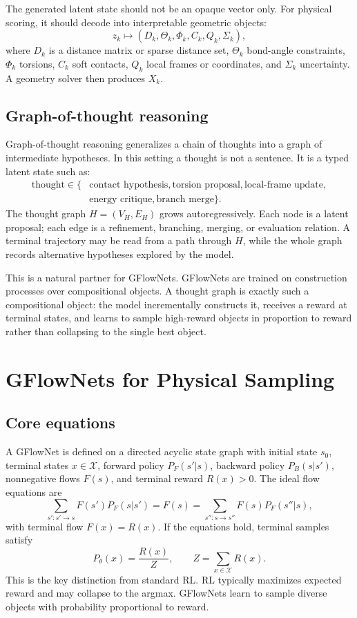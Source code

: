 \documentclass[11pt]{article}
\newcommand{\X}{\mathcal{X}}
\begin{document}
The generated latent state should not be an opaque vector only. For physical scoring, it should decode into interpretable geometric objects:
\[
z_k \mapsto
\left(
D_k,\Theta_k,\Phi_k,C_k,Q_k,\Sigma_k
\right),
\]
where $D_k$ is a distance matrix or sparse distance set, $\Theta_k$ bond-angle constraints, $\Phi_k$ torsions, $C_k$ soft contacts, $Q_k$ local frames or coordinates, and $\Sigma_k$ uncertainty. A geometry solver then produces $X_k$.

\subsection{Graph-of-thought reasoning}

Graph-of-thought reasoning generalizes a chain of thoughts into a graph of intermediate hypotheses. In this setting a thought is not a sentence. It is a typed latent state such as:
\[
\begin{aligned}
\text{thought}\in
\{&\text{contact hypothesis},\text{torsion proposal},\text{local-frame update},\\
  &\text{energy critique},\text{branch merge}\}.
\end{aligned}
\]
The thought graph $H=(V_H,E_H)$ grows autoregressively. Each node is a latent proposal; each edge is a refinement, branching, merging, or evaluation relation. A terminal trajectory may be read from a path through $H$, while the whole graph records alternative hypotheses explored by the model.

This is a natural partner for GFlowNets. GFlowNets are trained on construction processes over compositional objects. A thought graph is exactly such a compositional object: the model incrementally constructs it, receives a reward at terminal states, and learns to sample high-reward objects in proportion to reward rather than collapsing to the single best object.

\section{GFlowNets for Physical Sampling}

\subsection{Core equations}

A GFlowNet is defined on a directed acyclic state graph with initial state $s_0$, terminal states $x\in\X$, forward policy $P_F(s'|s)$, backward policy $P_B(s|s')$, nonnegative flows $F(s)$, and terminal reward $R(x)>0$. The ideal flow equations are
\[
\sum_{s':s'\to s} F(s')P_F(s|s')
=
F(s)
=
\sum_{s'':s\to s''}F(s)P_F(s''|s),
\]
with terminal flow $F(x)=R(x)$. If the equations hold, terminal samples satisfy
\[
P_\theta(x)=\frac{R(x)}{Z},\qquad Z=\sum_{x\in\X}R(x).
\]
This is the key distinction from standard RL. RL typically maximizes expected reward and may collapse to the argmax. GFlowNets learn to sample diverse objects with probability proportional to reward.
\end{document}
